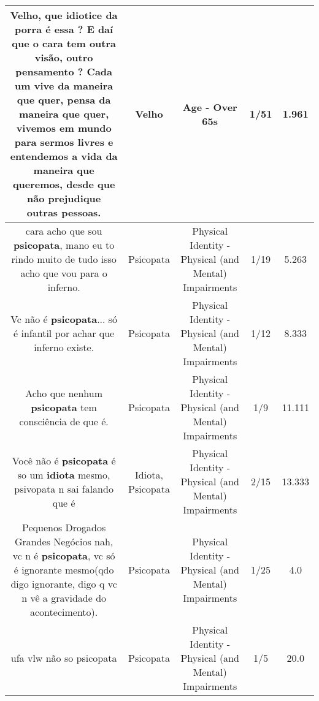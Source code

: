 \documentclass[11pt]{article}
\newlength\mylength
\begin{document}
\begin{center}
\begin{longtable}{|C{.65\mylength}|C{.30\mylength}|C{.12\mylength}|C{.12\mylength}|C{.12\mylength}|}
  \small Velho, que idiotice da porra é essa ? E daí que o cara tem outra visão, outro pensamento ? Cada um vive da maneira que quer, pensa da maneira que quer, vivemos em mundo para sermos livres e entendemos a vida da maneira que queremos, desde que não prejudique outras pessoas.\normalsize   & Velho & Age - Over 65s & 1/51 & 1.961 \\  \hline
  \small cara acho que sou \textbf{psicopata}, mano eu to rindo muito de tudo isso acho que vou para o inferno.\normalsize   & Psicopata & Physical Identity - Physical (and Mental) Impairments & 1/19 & 5.263 \\  \hline
  \small Vc não é \textbf{psicopata}... só é infantil por achar que inferno existe.\normalsize   & Psicopata & Physical Identity - Physical (and Mental) Impairments & 1/12 & 8.333 \\  \hline
  \small Acho que nenhum \textbf{psicopata} tem consciência de que é.\normalsize   & Psicopata & Physical Identity - Physical (and Mental) Impairments & 1/9 & 11.111 \\  \hline
  \small Você não é \textbf{psicopata} é so um \textbf{idiota} mesmo, psivopata n sai falando que é\normalsize   & Idiota, Psicopata & Physical Identity - Physical (and Mental) Impairments & 2/15 & 13.333 \\  \hline
  \small Pequenos Drogados Grandes Negócios nah, vc n é \textbf{psicopata}, vc só é ignorante mesmo(qdo digo ignorante, digo q vc n vê a gravidade do acontecimento).\normalsize   & Psicopata & Physical Identity - Physical (and Mental) Impairments & 1/25 & 4.0 \\  \hline
  \small ufa vlw não so psicopata\normalsize   & Psicopata & Physical Identity - Physical (and Mental) Impairments & 1/5 & 20.0 \\  \hline

\end{longtable}
\end{center}
\end{document}
